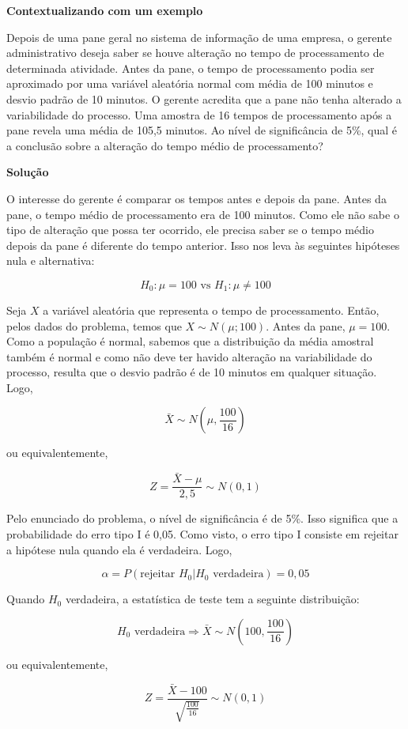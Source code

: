 \documentclass[
]{book}
\begin{document}
\textbf{Contextualizando com um exemplo}

Depois de uma pane geral no sistema de informação de uma empresa, o gerente administrativo deseja saber se houve alteração no tempo de processamento de determinada atividade. Antes da pane, o tempo de processamento podia ser aproximado por uma variável aleatória normal com média de 100 minutos e desvio padrão de 10 minutos. O gerente acredita que a pane não tenha alterado a variabilidade do processo. Uma amostra de 16 tempos de processamento após a pane revela uma média de 105,5 minutos. Ao nível de significância de 5\%, qual é a conclusão sobre a alteração do tempo médio de processamento?

\textbf{Solução}

O interesse do gerente é comparar os tempos antes e depois da pane. Antes da pane, o tempo médio de processamento era de 100 minutos. Como ele não sabe o tipo de alteração que possa ter ocorrido, ele precisa saber se o tempo médio depois da pane é diferente do tempo anterior. Isso nos leva às seguintes hipóteses nula e alternativa:

\[H_0:\mu=100\text{  vs  } H_1:\mu\neq 100\]

Seja \(X\) a variável aleatória que representa o tempo de processamento. Então, pelos dados do problema, temos que \(X\sim N(\mu; 100)\). Antes da pane, \(\mu =100\). Como a população é normal, sabemos que a distribuição da média amostral também é normal e como não deve ter havido alteração na variabilidade do processo, resulta que o desvio padrão é de 10 minutos em qualquer situação. Logo,

\[\bar X \sim N\left(\mu,\frac{100}{16}\right)\]

ou equivalentemente,

\[Z=\frac{\bar X-\mu}{2,5}\sim N(0,1)\]

Pelo enunciado do problema, o nível de significância é de 5\%. Isso significa que a probabilidade do erro tipo I é 0,05. Como visto, o erro tipo I consiste em rejeitar a hipótese nula quando ela é verdadeira. Logo,

\[\alpha=P(\text{rejeitar }H_0|H_0\text{ verdadeira})=0,05\]

Quando \(H_0\) verdadeira, a estatística de teste tem a seguinte distribuição:

\[H_0\text{ verdadeira} \Rightarrow \bar X \sim N\left(100,\frac{100}{16}\right)\]

ou equivalentemente,

\[Z=\frac{\bar X-100}{\sqrt{\frac{100}{16}}}\sim N(0,1)\]
\end{document}

